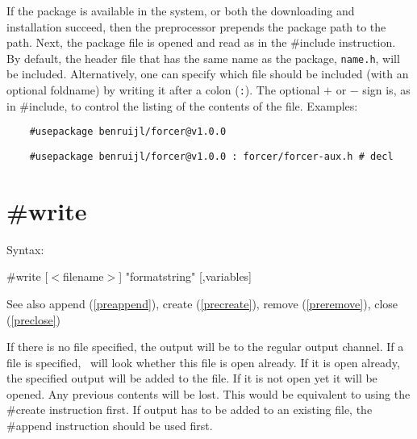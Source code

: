 If the package is available in the system, or both the downloading and 
installation succeed, then the preprocessor prepends the package path to the 
\FORM{} path. Next, the package file is opened and read as in the \#include 
instruction. By default, the header file that has the same name as the package, 
{\tt name.h}, will be included. Alternatively, one can specify which file 
should be included (with an optional foldname) by writing it after a colon 
({\tt :}). The optional $+$ or $-$ sign is, as in \#include, to control the 
listing of the contents of the file. Examples:
\begin{verbatim}
    #usepackage benruijl/forcer@v1.0.0
\end{verbatim}

\begin{verbatim}
    #usepackage benruijl/forcer@v1.0.0 : forcer/forcer-aux.h # decl
\end{verbatim}


\section{\#write}
\label{prewrite}

\noindent Syntax:

\#write [$<$filename$>$] "formatstring" [,variables]
 
\noindent See also append (\ref{preappend}),
            create (\ref{precreate}), remove (\ref{preremove}),
            close (\ref{preclose})

\noindent If there is no file specified, the output will be 
to the regular output channel. If a file is 
specified, \FORM\ will look whether this file is open already. If it is open 
already, the specified output will be added to the file. If it is not open 
yet it will be opened. Any previous contents will be lost. This would be 
equivalent to using the \#create instruction first. If 
output has to be added to an existing file, the \#append 
instruction should be used first.

